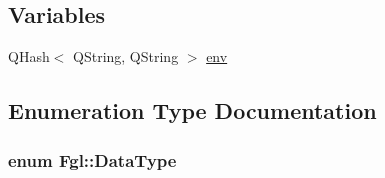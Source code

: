 \subsection*{Variables}
\begin{DoxyCompactItemize}
\item 
QHash$<$ QString, QString $>$ \hyperlink{namespaceFgl_a2efd7c9f3a914495e4d1ad2c0d557dc9}{env}
\end{DoxyCompactItemize}


\subsection{Enumeration Type Documentation}
\hypertarget{namespaceFgl_a221c9c0366d5227f8c27ca97308a691c}{
\subsubsection[{DataType}]{\setlength{\rightskip}{0pt plus 5cm}enum {\bf Fgl::DataType}}}
\label{namespaceFgl_a221c9c0366d5227f8c27ca97308a691c}
